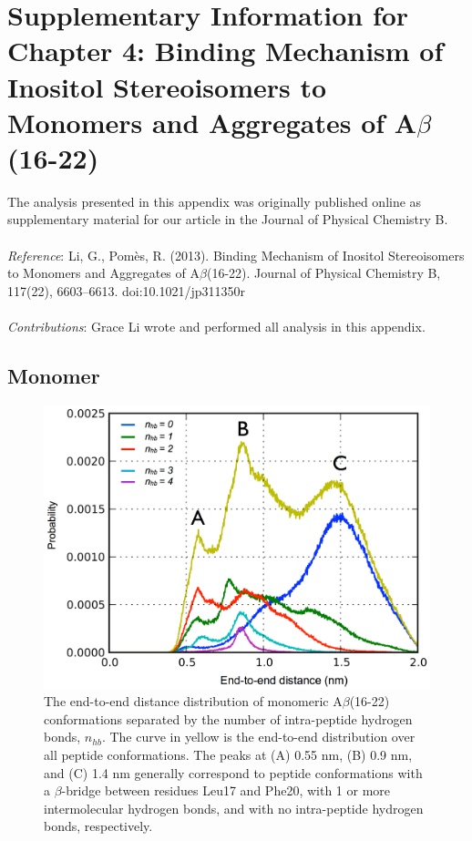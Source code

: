 
\chapter[Supplementary Information for Chapter 4]{Supplementary Information for Chapter 4: Binding Mechanism of Inositol Stereoisomers to Monomers and Aggregates of A$\beta$(16-22)}

The analysis presented in this appendix was originally published online as supplementary material for our article in the Journal of Physical Chemistry B. 
\\
\\
\emph{Reference}:
Li, G., Pom\`{e}s, R. (2013). Binding Mechanism of Inositol Stereoisomers to Monomers and Aggregates of A$\beta$(16-22). Journal of Physical Chemistry B, 117(22), 6603–6613. doi:10.1021/jp311350r
\\
\\
\emph{Contributions}: 
Grace Li wrote and performed all analysis in this appendix.

\newpage

\section{Monomer}

\begin{figure}[ht]
\centering
\includegraphics[width=14cm]{figures/appendixA/inos2_figures_SI_monomer_eed_by_hbonds.pdf}
\caption[The end-to-end distance distribution of monomeric A$\beta$(16-22) conformations separated by the number of intra-peptide hydrogen bonds, $n_{hb}$. ]{The end-to-end distance distribution of monomeric A$\beta$(16-22) conformations separated by the number of intra-peptide hydrogen bonds, $n_{hb}$. The curve in yellow is the end-to-end distribution over all peptide conformations. The peaks at (A) 0.55 nm, (B) 0.9 nm, and (C) 1.4 nm generally correspond to peptide conformations with a $\beta$-bridge between residues Leu17 and Phe20, with 1 or more intermolecular hydrogen bonds, and with no intra-peptide hydrogen bonds, respectively.}
\label{fig:SI-monomersEedByHbonds}
\end{figure}

